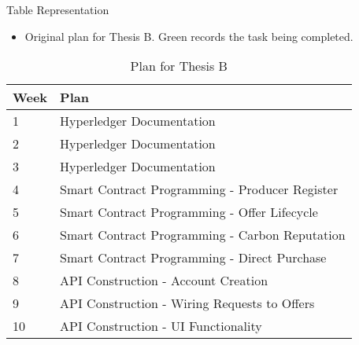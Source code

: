 \begin{frame}{Table Representation}
    \begin{itemize}
        \item Original plan for Thesis B. Green records the task being completed.
    \end{itemize}
    \begin{table}[]
        \caption{Plan for Thesis B}
        \label{tab:my-table}
        \begin{tabular}{|l|l|}
            \hline
            Week & Plan                                                                   \\ \hline
            1    & \cellcolor[HTML]{32CB00}Hyperledger Documentation                      \\ \hline
            2    & \cellcolor[HTML]{32CB00}Hyperledger Documentation                      \\ \hline
            3    & \cellcolor[HTML]{32CB00}Hyperledger Documentation                      \\ \hline
            4    & \cellcolor[HTML]{32CB00}Smart Contract Programming - Producer Register \\ \hline
            5    & \cellcolor[HTML]{32CB00}Smart Contract Programming - Offer Lifecycle   \\ \hline
            6    & \cellcolor[HTML]{32CB00}Smart Contract Programming - Carbon Reputation \\ \hline
            7    & \cellcolor[HTML]{32CB00}Smart Contract Programming - Direct Purchase   \\ \hline
            8    & \cellcolor[HTML]{32CB00}API Construction - Account Creation            \\ \hline
            9    & \cellcolor[HTML]{32CB00}API Construction - Wiring Requests to Offers   \\ \hline
            10   & \cellcolor[HTML]{32CB00}API Construction - UI Functionality            \\ \hline
        \end{tabular}
    \end{table}
\end{frame}
